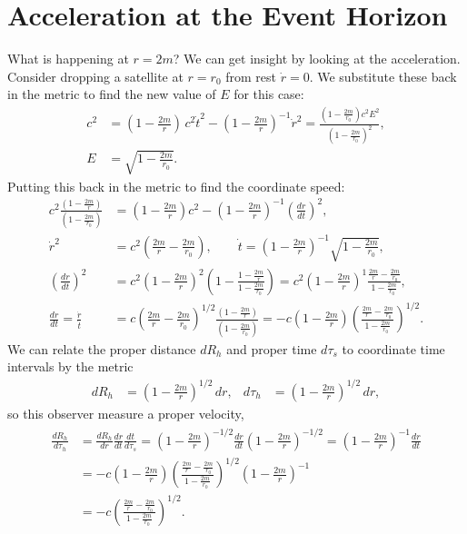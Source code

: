 \documentclass[a4paper, 11pt, normalem]{report}
\begin{document}
\section{Acceleration at the Event Horizon}
What is happening at $r=2m$?
We can get insight by looking at the acceleration. 
Consider dropping a satellite at $r=r_0$ from rest $\dot{r}=0$. 
We substitute these back in the metric to find the new value of $E$ for this case:
\begin{align}
    c^2 &= \left(1-\frac{2m}{r}\right)\,c^2\dot{t}^2 - \left(1-\frac{2m}{r}\right)^{-1}\dot{r}^2 = \frac{\left(1-\frac{2m}{r_0}\right)c^2E^2}{\left(1-\frac{2m}{r_0}\right)^2},\\
    E &= \sqrt{1-\frac{2m}{r_0}}.
\end{align}
Putting this back in the metric to find the coordinate speed:
\begin{align}
    c^2\frac{\left(1-\frac{2m}{r}\right)}{\left(1-\frac{2m}{r_0}\right)} &= \left(1-\frac{2m}{r}\right)c^2 - \left(1-\frac{2m}{r}\right)^{-1}\left(\frac{dr}{dt}\right)^2, \\
    \dot{r}^2 &= c^2\left(\frac{2m}{r} - \frac{2m}{r_0}\right),\qquad  \dot{t} = \left(1-\frac{2m}{r}\right)^{-1}\sqrt{1-\frac{2m}{r_0}},\\
    \left(\frac{dr}{dt}\right)^2 &= c^2\left(1-\frac{2m}{r}\right)^2\left(1-\frac{1-\frac{2m}{r}}{1-\frac{2m}{r_0}}\right) = c^2\left(1-\frac{2m}{r}\right)^1\frac{\frac{2m}{r}-\frac{2m}{r_0}}{1-\frac{2m}{r_0}},\\
    \frac{dr}{dt} = \frac{\dot{r}}{\dot{t}} &= c\left(\frac{2m}{r}-\frac{2m}{r_0}\right)^{1/2}\frac{\left(1-\frac{2m}{r}\right)}{\left(1-\frac{2m}{r_0}\right)} = -c\left(1-\frac{2m}{r}\right)\left(\frac{\frac{2m}{r}-\frac{2m}{r_0}}{1-\frac{2m}{r_0}}\right)^{1/2}.
\end{align}
We can relate the proper distance $dR_h$ and proper time $d\tau_s$ to coordinate time intervals by the metric 
\begin{align}
    dR_h &=\left(1-\frac{2m}{r}\right)^{1/2}\,dr,& d\tau_h &= \left(1-\frac{2m}{r}\right)^{1/2}\,dr,
\end{align}
so this observer measure a proper velocity,
\begin{align}
    \begin{split}
        \frac{dR_h}{d\tau_h} &= \frac{dR_h}{dr}\frac{dr}{dt}\frac{dt}{d\tau_s} = \left(1-\frac{2m}{r}\right)^{-1/2}\frac{dr}{dt}\left(1-\frac{2m}{r}\right)^{-1/2} = \left(1-\frac{2m}{r}\right)^{-1}\frac{dr}{dt} \\
                             &= -c\left(1-\frac{2m}{r}\right)\left(\frac{\frac{2m}{r}-\frac{2m}{r_0}}{1-\frac{2m}{r_0}}\right)^{1/2}\left(1-\frac{2m}{r}\right)^{-1} \\
                             &= -c\left(\frac{\frac{2m}{r}-\frac{2m}{r_0}}{1-\frac{2m}{r_0}}\right)^{1/2}.
    \end{split}
\end{align}
\end{document}
